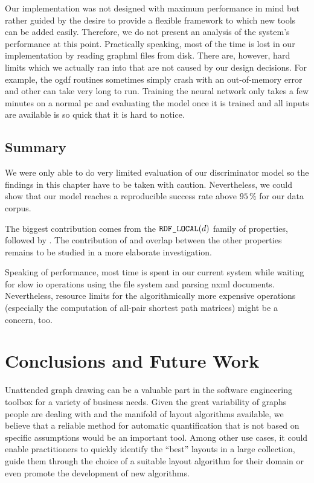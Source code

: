 \documentclass{graphstudy}
\begin{document}
Our implementation was not designed with maximum performance in mind but rather guided by the desire to provide a
flexible framework to which new tools can be added easily.  Therefore, we do not present an analysis of the system's
performance at this point.  Practically speaking, most of the time is lost in our implementation by reading \ac{graphml}
files from disk.  There are, however, hard limits which we actually ran into that are not caused by our design
decisions.  For example, the \ac{ogdf} routines sometimes simply crash with an out-of-memory error and other can take
very long to run.  Training the neural network only takes a few minutes on a normal \acs{pc} and evaluating the model
once it is trained and all inputs are available is so quick that it is hard to notice.

\section{Summary}

We were only able to do very limited evaluation of our discriminator model so the findings in this chapter have to be
taken with caution.  Nevertheless, we could show that our model reaches a reproducible success rate above \(95\,\%\) for
our data corpus.

The biggest contribution comes from the \(\mbox{\text{\upshape\ttfamily RDF\_LOCAL}}(d)\) family of properties, followed by .
The contribution of and overlap between the other properties remains to be studied in a more elaborate investigation.

Speaking of performance, most time is spent in our current system while waiting for slow \acs{io} operations using the
file system and parsing \acs{nxml} documents.  Nevertheless, resource limits for the algorithmically more expensive
operations (especially the computation of all-pair shortest path matrices) might be a concern, too.

\chapter{Conclusions and Future Work}
\label{chap:conclusion}

Unattended graph drawing can be a valuable part in the software engineering toolbox for a variety of business needs.
Given the great variability of graphs people are dealing with and the manifold of layout algorithms available, we
believe that a reliable method for automatic quantification that is not based on specific assumptions would be an
important tool.  Among other use cases, it could enable practitioners to quickly identify the \enquote{best} layouts in
a large collection, guide them through the choice of a suitable layout algorithm for their domain or even promote the
development of new algorithms.
\end{document}
